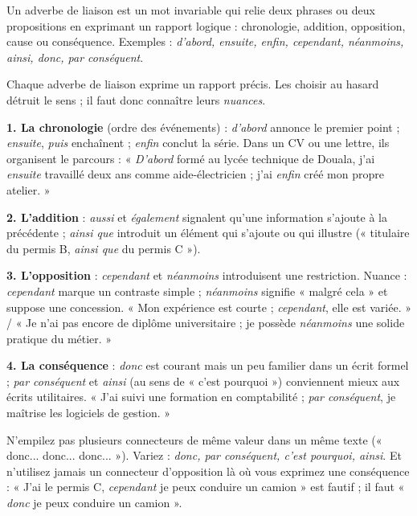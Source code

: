 \documentclass[11pt]{article}
\newcommand{\cle}[1]{{\popxbold\color{popdark}#1}}
\newcounter{popsec}
\newcounter{popsub}
\newcommand{\courssub}[1]{%
  \stepcounter{popsub}%
  \par\vspace{9pt}\noindent{\popxbold\fontsize{11.5}{13}\selectfont\color{popink}{\color{poporange}\thepopsec.\thepopsub}\hspace{6pt}#1}\par\nopagebreak\vspace{4pt}
}
\begin{document}
\courssub{Les adverbes de liaison}

\begin{definition}
Un \cle{adverbe de liaison} est un mot invariable qui relie deux phrases ou deux propositions en exprimant un rapport logique : chronologie, addition, opposition, cause ou conséquence. Exemples : \emph{d'abord, ensuite, enfin, cependant, néanmoins, ainsi, donc, par conséquent}.
\end{definition}

Chaque adverbe de liaison exprime un rapport précis. Les choisir au hasard détruit le sens ; il faut donc connaître leurs \emph{nuances}.

\textbf{1. La chronologie} (ordre des événements) : \emph{d'abord} annonce le premier point ; \emph{ensuite}, \emph{puis} enchaînent ; \emph{enfin} conclut la série. Dans un CV ou une lettre, ils organisent le parcours : « \emph{D'abord} formé au lycée technique de Douala, j'ai \emph{ensuite} travaillé deux ans comme aide-électricien ; j'ai \emph{enfin} créé mon propre atelier. »

\textbf{2. L'addition} : \emph{aussi} et \emph{également} signalent qu'une information s'ajoute à la précédente ; \emph{ainsi que} introduit un élément qui s'ajoute ou qui illustre (« titulaire du permis B, \emph{ainsi que} du permis C »).

\textbf{3. L'opposition} : \emph{cependant} et \emph{néanmoins} introduisent une restriction. Nuance : \emph{cependant} marque un contraste simple ; \emph{néanmoins} signifie « malgré cela » et suppose une concession. « Mon expérience est courte ; \emph{cependant}, elle est variée. » / « Je n'ai pas encore de diplôme universitaire ; je possède \emph{néanmoins} une solide pratique du métier. »

\textbf{4. La conséquence} : \emph{donc} est courant mais un peu familier dans un écrit formel ; \emph{par conséquent} et \emph{ainsi} (au sens de « c'est pourquoi ») conviennent mieux aux écrits utilitaires. « J'ai suivi une formation en comptabilité ; \emph{par conséquent}, je maîtrise les logiciels de gestion. »

\begin{attention}
N'empilez pas plusieurs connecteurs de même valeur dans un même texte (« donc... donc... donc... »). Variez : \emph{donc, par conséquent, c'est pourquoi, ainsi}. Et n'utilisez jamais un connecteur d'opposition là où vous exprimez une conséquence : « J'ai le permis C, \emph{cependant} je peux conduire un camion » est fautif ; il faut « \emph{donc} je peux conduire un camion ».
\end{attention}
\end{document}
